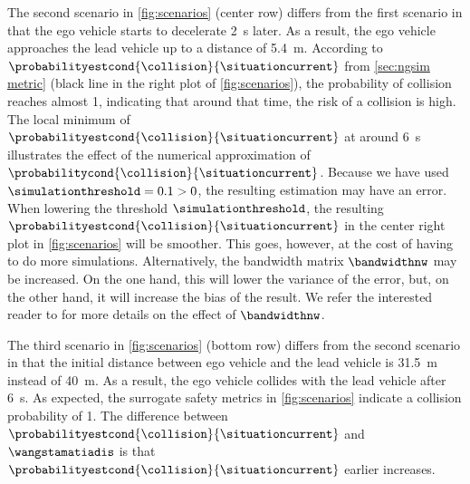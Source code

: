 The second scenario in \cref{fig:scenarios} (center row) differs from the first scenario in that the ego vehicle starts to decelerate \SI{2}{\second} later.
As a result, the ego vehicle approaches the lead vehicle up to a distance of \SI{5.4}{\meter}.
According to $\probabilityestcond{\collision}{\situationcurrent}$ from \cref{sec:ngsim metric} (black line in the right plot of \cref{fig:scenarios}), the probability of collision reaches almost 1, indicating that around that time, the risk of a collision is high.
The local minimum of $\probabilityestcond{\collision}{\situationcurrent}$ at around \SI{6}{\second} illustrates the effect of the numerical approximation of $\probabilitycond{\collision}{\situationcurrent}$.
Because we have used $\simulationthreshold=0.1>0$, the resulting estimation may have an error. 
When lowering the threshold $\simulationthreshold$, the resulting $\probabilityestcond{\collision}{\situationcurrent}$ in the center right plot in \cref{fig:scenarios} will be smoother. 
This goes, however, at the cost of having to do more simulations.
Alternatively, the bandwidth matrix $\bandwidthnw$ may be increased. 
On the one hand, this will lower the variance of the error, but, on the other hand, it will increase the bias of the result.
We refer the interested reader to \autocite{chen2017tutorial} for more details on the effect of $\bandwidthnw$.

The third scenario in \cref{fig:scenarios} (bottom row) differs from the second scenario in that the initial distance between ego vehicle and the lead vehicle is \SI{31.5}{\meter} instead of \SI{40}{\meter}. 
As a result, the ego vehicle collides with the lead vehicle after \SI{6}{\second}.
As expected, the surrogate safety metrics in \cref{fig:scenarios} indicate a collision probability of 1.
The difference between $\probabilityestcond{\collision}{\situationcurrent}$ and $\wangstamatiadis$ is that $\probabilityestcond{\collision}{\situationcurrent}$ earlier increases. 
